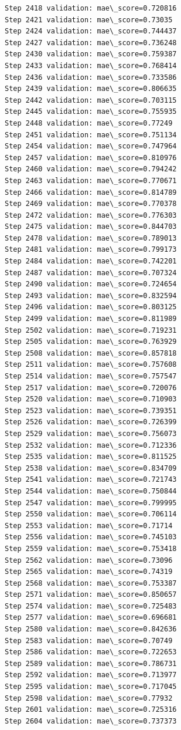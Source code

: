 \documentclass[11pt]{article}
\begin{document}
\begin{Verbatim}[commandchars=\\\{\}]
Step 2418 validation: mae\_score=0.720816
Step 2421 validation: mae\_score=0.73035
Step 2424 validation: mae\_score=0.744437
Step 2427 validation: mae\_score=0.736248
Step 2430 validation: mae\_score=0.759387
Step 2433 validation: mae\_score=0.768414
Step 2436 validation: mae\_score=0.733586
Step 2439 validation: mae\_score=0.806635
Step 2442 validation: mae\_score=0.703115
Step 2445 validation: mae\_score=0.755935
Step 2448 validation: mae\_score=0.77249
Step 2451 validation: mae\_score=0.751134
Step 2454 validation: mae\_score=0.747964
Step 2457 validation: mae\_score=0.810976
Step 2460 validation: mae\_score=0.794242
Step 2463 validation: mae\_score=0.770671
Step 2466 validation: mae\_score=0.814789
Step 2469 validation: mae\_score=0.770378
Step 2472 validation: mae\_score=0.776303
Step 2475 validation: mae\_score=0.844703
Step 2478 validation: mae\_score=0.789013
Step 2481 validation: mae\_score=0.799173
Step 2484 validation: mae\_score=0.742201
Step 2487 validation: mae\_score=0.707324
Step 2490 validation: mae\_score=0.724654
Step 2493 validation: mae\_score=0.832594
Step 2496 validation: mae\_score=0.803125
Step 2499 validation: mae\_score=0.811989
Step 2502 validation: mae\_score=0.719231
Step 2505 validation: mae\_score=0.763929
Step 2508 validation: mae\_score=0.857818
Step 2511 validation: mae\_score=0.757608
Step 2514 validation: mae\_score=0.757547
Step 2517 validation: mae\_score=0.720076
Step 2520 validation: mae\_score=0.710903
Step 2523 validation: mae\_score=0.739351
Step 2526 validation: mae\_score=0.726399
Step 2529 validation: mae\_score=0.756073
Step 2532 validation: mae\_score=0.712336
Step 2535 validation: mae\_score=0.811525
Step 2538 validation: mae\_score=0.834709
Step 2541 validation: mae\_score=0.721743
Step 2544 validation: mae\_score=0.750844
Step 2547 validation: mae\_score=0.799995
Step 2550 validation: mae\_score=0.706114
Step 2553 validation: mae\_score=0.71714
Step 2556 validation: mae\_score=0.745103
Step 2559 validation: mae\_score=0.753418
Step 2562 validation: mae\_score=0.73096
Step 2565 validation: mae\_score=0.74319
Step 2568 validation: mae\_score=0.753387
Step 2571 validation: mae\_score=0.850657
Step 2574 validation: mae\_score=0.725483
Step 2577 validation: mae\_score=0.696681
Step 2580 validation: mae\_score=0.842636
Step 2583 validation: mae\_score=0.70749
Step 2586 validation: mae\_score=0.722653
Step 2589 validation: mae\_score=0.786731
Step 2592 validation: mae\_score=0.713977
Step 2595 validation: mae\_score=0.717045
Step 2598 validation: mae\_score=0.77932
Step 2601 validation: mae\_score=0.725316
Step 2604 validation: mae\_score=0.737373

\end{Verbatim}
\end{document}
